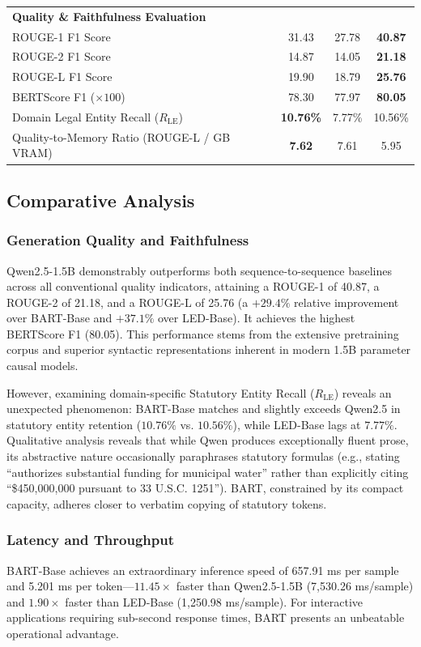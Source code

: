 \documentclass[conference]{IEEEtran}
\begin{document}
\begin{table}[t]
{\begin{tabular}{|l|c|c|c|}
\hline
\textbf{Quality \& Faithfulness Evaluation} & & & \\
ROUGE-1 F1 Score & 31.43 & 27.78 & \textbf{40.87} \\
ROUGE-2 F1 Score & 14.87 & 14.05 & \textbf{21.18} \\
ROUGE-L F1 Score & 19.90 & 18.79 & \textbf{25.76} \\
BERTScore F1 ($\times 100$) & 78.30 & 77.97 & \textbf{80.05} \\
Domain Legal Entity Recall ($R_{\text{LE}}$) & \textbf{10.76\%} & 7.77\% & 10.56\% \\
Quality-to-Memory Ratio (ROUGE-L / GB VRAM) & \textbf{7.62} & 7.61 & 5.95 \\
\hline
\end{tabular}%
}
\end{table}

\subsection{Comparative Analysis}

\subsubsection{Generation Quality and Faithfulness}
Qwen2.5-1.5B demonstrably outperforms both sequence-to-sequence baselines across all conventional quality indicators, attaining a ROUGE-1 of 40.87, a ROUGE-2 of 21.18, and a ROUGE-L of 25.76 (a $+29.4\%$ relative improvement over BART-Base and $+37.1\%$ over LED-Base). It achieves the highest BERTScore F1 (80.05). This performance stems from the extensive pretraining corpus and superior syntactic representations inherent in modern 1.5B parameter causal models.

However, examining domain-specific Statutory Entity Recall ($R_{\text{LE}}$) reveals an unexpected phenomenon: BART-Base matches and slightly exceeds Qwen2.5 in statutory entity retention ($10.76\%$ vs. $10.56\%$), while LED-Base lags at $7.77\%$. Qualitative analysis reveals that while Qwen produces exceptionally fluent prose, its abstractive nature occasionally paraphrases statutory formulas (e.g., stating ``authorizes substantial funding for municipal water'' rather than explicitly citing ``\$450,000,000 pursuant to 33 U.S.C. 1251''). BART, constrained by its compact capacity, adheres closer to verbatim copying of statutory tokens.

\subsubsection{Latency and Throughput}
BART-Base achieves an extraordinary inference speed of 657.91 ms per sample and 5.201 ms per token---$11.45\times$ faster than Qwen2.5-1.5B (7,530.26 ms/sample) and $1.90\times$ faster than LED-Base (1,250.98 ms/sample). For interactive applications requiring sub-second response times, BART presents an unbeatable operational advantage.
\end{document}
